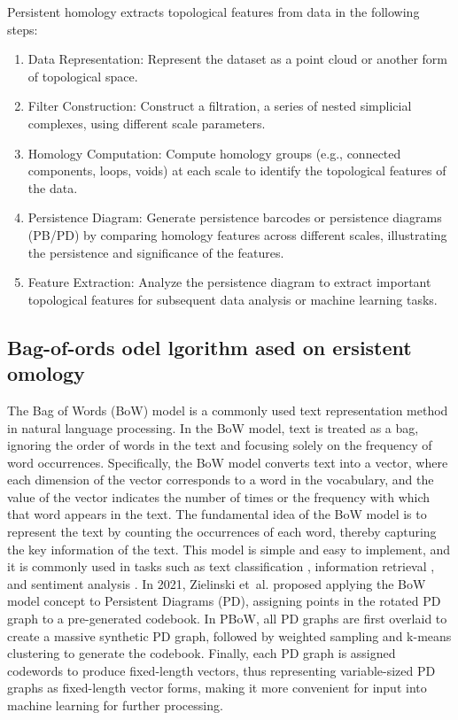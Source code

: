 \documentclass[5GeSdc,ASOC,numref,printGA,printHL,CASflow,nocrossmark,longtitle,PROOF]{/usr/local/texlive/iTemplates/01-Templates/01-Els-Jnl/01-Standard_Templates/V1/ELS_MDL5-V1-6}
\begin{document}
\begin{articlestyle}
Persistent homology extracts topological features from data in the following steps:
\begin{enumerate}
	\item[Step 1] Data Representation: Represent the dataset as a point cloud or another form of topological space.
	\item[Step 2] Filter Construction: Construct a filtration, a series of nested simplicial complexes, using different scale parameters.
	\item[Step 3] Homology Computation: Compute homology groups (e.g., connected components, loops, voids) at each scale to identify the topological features of the data.
	\item[Step 4]  Persistence Diagram: Generate persistence barcodes or persistence diagrams (PB/PD) by comparing homology features across different scales, illustrating the persistence and significance of the features.
	\item[Step 5] Feature Extraction: Analyze the persistence diagram to extract important topological features for subsequent data analysis or machine learning tasks.
\end{enumerate}

\subsection{Bag-of-ords odel lgorithm ased on ersistent omology}\label{sec2.3}

The Bag of Words (BoW) model is a commonly used text representation method in natural language processing. In the BoW model, text is treated as a bag, ignoring the order of words in the text and focusing solely on the frequency of word occurrences. Specifically, the BoW model converts text into a vector, where each dimension of the vector corresponds to a word in the vocabulary, and the value of the vector indicates the number of times or the frequency with which that word appears in the text. The fundamental idea of the BoW model is to represent the text by counting the occurrences of each word, thereby capturing the key information of the text. This model is simple and easy to implement, and it is commonly used in tasks such as text classification \cite{hacohen2020influence}, information retrieval \cite{qiu2020fuzzy}, and sentiment analysis \cite{abubakar2022sentiment}. In 2021, Zielinski et~al. \cite{zielinski2021persistence} proposed applying the BoW model concept to Persistent Diagrams (PD), assigning points in the rotated PD graph to a pre-generated codebook. In PBoW, all PD graphs are first overlaid to create a massive synthetic PD graph, followed by weighted sampling and k-means clustering to generate the codebook. Finally, each PD graph is assigned codewords to produce fixed-length vectors, thus representing variable-sized PD graphs as fixed-length vector forms, making it more convenient for input into machine learning for further processing.


\end{articlestyle}
\end{document}
